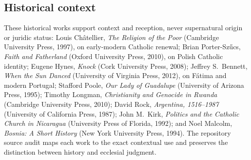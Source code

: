\subsection{Historical context}

These historical works support context and reception, never supernatural origin or juridic status: Louis Châtellier, \emph{The Religion of the Poor} (Cambridge University Press, 1997), on early-modern Catholic renewal; Brian Porter-Szűcs, \emph{Faith and Fatherland} (Oxford University Press, 2010), on Polish Catholic identity; Eugene Hynes, \emph{Knock} (Cork University Press, 2008); Jeffrey S.~Bennett, \emph{When the Sun Danced} (University of Virginia Press, 2012), on Fátima and modern Portugal; Stafford Poole, \emph{Our Lady of Guadalupe} (University of Arizona Press, 1995); Timothy Longman, \emph{Christianity and Genocide in Rwanda} (Cambridge University Press, 2010); David Rock, \emph{Argentina, 1516--1987} (University of California Press, 1987); John M.~Kirk, \emph{Politics and the Catholic Church in Nicaragua} (University Press of Florida, 1992); and Noel Malcolm, \emph{Bosnia: A Short History} (New York University Press, 1994). The repository source audit maps each work to the exact contextual use and preserves the distinction between history and ecclesial judgment.

\endgroup
